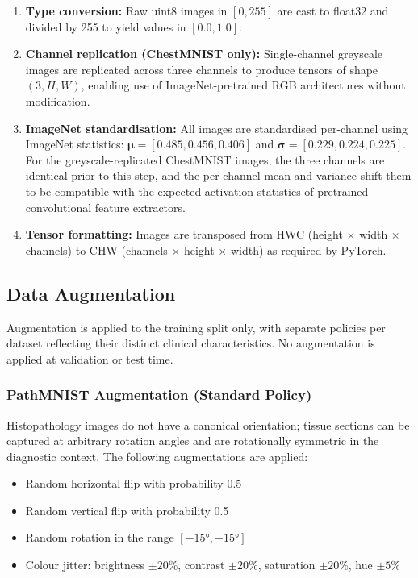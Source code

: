 \begin{enumerate}
    \item \textbf{Type conversion:} Raw uint8 images in $[0, 255]$ are cast to float32 and divided by 255 to yield values in $[0.0, 1.0]$.
    \item \textbf{Channel replication (ChestMNIST only):} Single-channel greyscale images are replicated across three channels to produce tensors of shape $(3, H, W)$, enabling use of ImageNet-pretrained RGB architectures without modification.
    \item \textbf{ImageNet standardisation:} All images are standardised per-channel using ImageNet statistics: $\boldsymbol{\mu} = [0.485, 0.456, 0.406]$ and $\boldsymbol{\sigma} = [0.229, 0.224, 0.225]$. For the greyscale-replicated ChestMNIST images, the three channels are identical prior to this step, and the per-channel mean and variance shift them to be compatible with the expected activation statistics of pretrained convolutional feature extractors.
    \item \textbf{Tensor formatting:} Images are transposed from HWC (height $\times$ width $\times$ channels) to CHW (channels $\times$ height $\times$ width) as required by PyTorch.
\end{enumerate}

\subsection{Data Augmentation}

Augmentation is applied to the training split only, with separate policies per dataset reflecting their distinct clinical characteristics. No augmentation is applied at validation or test time.

\subsubsection{PathMNIST Augmentation (Standard Policy)}

Histopathology images do not have a canonical orientation; tissue sections can be captured at arbitrary rotation angles and are rotationally symmetric in the diagnostic context. The following augmentations are applied:

\begin{itemize}
    \item Random horizontal flip with probability 0.5
    \item Random vertical flip with probability 0.5
    \item Random rotation in the range $[-15°, +15°]$
    \item Colour jitter: brightness $\pm 20\%$, contrast $\pm 20\%$, saturation $\pm 20\%$, hue $\pm 5\%$
\end{itemize}

